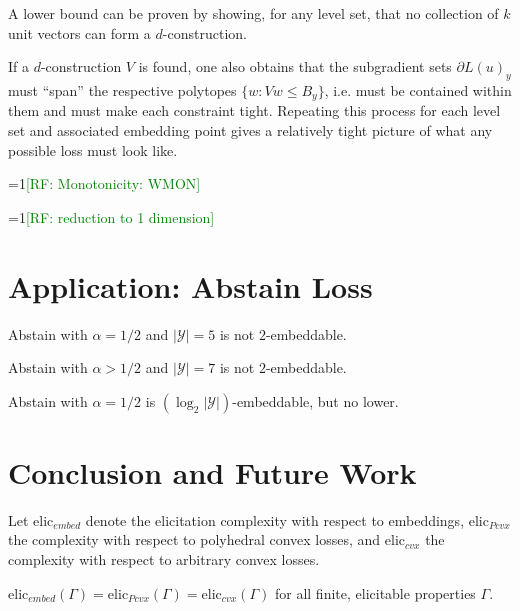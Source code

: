 \documentclass[11pt]{colt2019}
\newcommand{\Comments}{1}
\newcommand{\mynote}[2]{\ifnum\Comments=1\textcolor{#1}{#2}\fi}
\newcommand{\raf}[1]{\mynote{green}{[RF: #1]}}
\newcommand{\Y}{\mathcal{Y}}
\begin{document}
A lower bound can be proven by showing, for any level set, that no collection of $k$ unit vectors can form a $d$-construction.

If a $d$-construction $V$ is found, one also obtains that the subgradient sets $\partial L(u)_y$ must ``span'' the respective polytopes $\{w : Vw \leq B_y\}$, i.e. must be contained within them and must make each constraint tight.
Repeating this process for each level set and associated embedding point gives a relatively tight picture of what any possible loss must look like.

\begin{corollary}
  \raf{Monotonicity: WMON}
\end{corollary}

\begin{corollary}
  \raf{reduction to 1 dimension}
\end{corollary}

\section{Application: Abstain Loss}

\begin{theorem}
  Abstain with $\alpha=1/2$ and $|\Y|=5$ is not $2$-embeddable.
\end{theorem}

\begin{theorem}
  Abstain with $\alpha > 1/2$ and $|\Y|=7$ is not $2$-embeddable.
\end{theorem}

\begin{conjecture}
  Abstain with $\alpha=1/2$ is $(\log_2 |\Y|)$-embeddable, but no lower.
\end{conjecture}

\section{Conclusion and Future Work}

Let $\mathrm{elic}_{embed}$ denote the elicitation complexity with respect to embeddings, $\mathrm{elic}_{Pcvx}$ the complexity with respect to polyhedral convex losses, and $\mathrm{elic}_{cvx}$ the complexity with respect to arbitrary convex losses.

\begin{conjecture}
  $\mathrm{elic}_{embed}(\Gamma) = \mathrm{elic}_{Pcvx}(\Gamma) = \mathrm{elic}_{cvx}(\Gamma)$ for all finite, elicitable properties $\Gamma$.
\end{conjecture}
\end{document}
